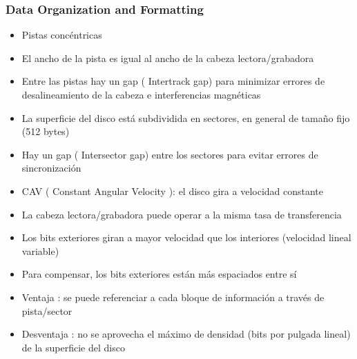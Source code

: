 \subsubsection{Data Organization and Formatting}
\begin{itemize}
\item Pistas concéntricas
\item El ancho de la pista es igual al ancho de la cabeza lectora/grabadora
\item Entre las pistas hay un gap ( Intertrack gap) para minimizar errores de desalineamiento de la cabeza e interferencias magnéticas
\item La superficie del disco está subdividida en sectores, en general de tamaño fijo (512 bytes)
\item Hay un gap ( Intersector gap) entre los sectores para evitar errores de sincronización
\item CAV ( Constant Angular Velocity ): el disco gira a velocidad constante
\item La cabeza lectora/grabadora puede operar a la misma tasa de transferencia
\item Los bits exteriores giran a mayor velocidad que los interiores (velocidad lineal variable)
\item Para compensar, los bits exteriores están más espaciados entre sí
\item Ventaja : se puede referenciar a cada bloque de información a través de pista/sector
\item Desventaja : no se aprovecha el máximo de densidad (bits por pulgada lineal) de la superficie del disco
\end{itemize}

